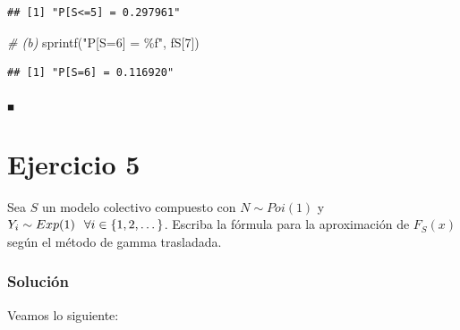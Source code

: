 \documentclass[
]{article}
\newenvironment{Shaded}{\begin{snugshade}}{\end{snugshade}}
\newcommand{\CommentTok}[1]{\textcolor[rgb]{0.56,0.35,0.01}{\textit{#1}}}
\newcommand{\DecValTok}[1]{\textcolor[rgb]{0.00,0.00,0.81}{#1}}
\newcommand{\FunctionTok}[1]{\textcolor[rgb]{0.00,0.00,0.00}{#1}}
\newcommand{\NormalTok}[1]{#1}
\newcommand{\StringTok}[1]{\textcolor[rgb]{0.31,0.60,0.02}{#1}}
\begin{document}
\begin{verbatim}
## [1] "P[S<=5] = 0.297961"
\end{verbatim}

\begin{Shaded}
\begin{Highlighting}[]
\CommentTok{\# (b)}
\FunctionTok{sprintf}\NormalTok{(}\StringTok{"P[S=6] = \%f"}\NormalTok{, fS[}\DecValTok{7}\NormalTok{])}
\end{Highlighting}
\end{Shaded}

\begin{verbatim}
## [1] "P[S=6] = 0.116920"
\end{verbatim}

\(_\blacksquare\)

\hypertarget{ejercicio-5}{%
\section{Ejercicio 5}\label{ejercicio-5}}

Sea \(S\) un modelo colectivo compuesto con \(N\sim Poi(1)\) y
\(Y_i\sim Exp(1) \hspace{0.25cm} \forall i\in \{1,2,\dots\}\). Escriba
la fórmula para la aproximación de \(F_S(x)\) según el método de gamma
trasladada.

\hypertarget{soluciuxf3n-4}{%
\subsubsection{Solución}\label{soluciuxf3n-4}}

Veamos lo siguiente:
\end{document}
